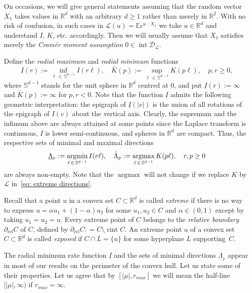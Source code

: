 \documentclass[10pt]{amsart}
\theoremstyle{definition}\newtheorem{defi}[theo]{Definition}\newtheorem{rema}[theo]{Remark}\newtheorem{exam}[theo]{Example}\newtheorem{exem}[theo]{Example}\newtheorem{nota}[theo]{Notation}
\DeclareMathOperator{\rint}{rint}
\DeclareMathOperator{\intr}{int}
\DeclareMathOperator{\rel}{rel}
\newcommand{\ubar}[1]{\underline{#1}}
\newcommand{\Rbb}{\mathbb{R}}
\newcommand{\E}{\mathbb{E}}
\newcommand{\Sbb}{\mathbb{S}}
\newcommand{\Dcl}{\mathcal{D}}
\newcommand{\Lcl}{\mathcal{L}}
\newcommand{\argmax}{\mathop{\mathrm{argmax}}\nolimits}
\newcommand{\argmin}{\mathop{\mathrm{argmin}}\nolimits}
\begin{document}
On occasions, we will give general statements assuming that the random vector $X_1$ takes values in $\Rbb^d$ with an arbitrary $d \ge 1$ rather than merely in $\Rbb^2$. With no risk of confusion, in such cases in $\Lcl(u)= \E e^{u\,\cdot\,X_1}$ we take $u \in \Rbb^d$ and understand $I$, $K$, etc. accordingly. Then we will usually assume that $X_1$ satisfies merely the \emph{Cram\'er moment assumption} $0 \in \intr \Dcl_{\Lcl}$.

Define the \emph{radial maximum} and \emph{radial minimum} functions
\begin{equation}\label{eq: radial functions}
\ubar{I}(r):= \inf_{\ell\,\in\,\Sbb^{d-1}} I(r\ell), \quad \bar K(p):= \sup_{\ell\,\in\,\Sbb^{d-1}} K(p\ell), \quad p, r \ge 0,
\end{equation}
where $\Sbb^{d-1}$ stands for the unit sphere in $\Rbb^d$ centred at $0$, and put $\ubar I(r):= \infty$ and $\bar K(p) := \infty$ for $p, r<0$. Note that the function $\ubar I$ admits the following geometric interpretation: the epigraph of $\ubar I(|v|)$ is the union of all rotations of the epigraph of $I(v)$ about the vertical axis. Clearly, the supremum and the infimum above are always attained at some points since the Laplace transform is continuous, $I$ is lower semi-continuous, and spheres in $\Rbb^d$ are compact. Thus, the respective sets of minimal and maximal directions
\begin{equation}\label{eq: extreme directions}
\ubar{\Lambda}_r:=\argmin \limits_{\ell\,\in\,\Sbb^{d-1}} I(r \ell), \quad \bar{\Lambda}_p:= \argmax \limits_{\ell\,\in\, \Sbb^{d-1}} K(p \ell), \quad r,p \ge 0
\end{equation}
are always non-empty. Note that the $\argmax$ will not change if we replace $K$ by $\Lcl$ in~\eqref{eq: extreme directions}.



Recall that a point $u$ in a convex set $C \subset \Rbb^d$ is called \emph{extreme} if there is no way to express $u = \alpha u_1 + (1- \alpha) u_2$ for some $u_1, u_2 \in C$ and $\alpha \in (0,1)$ except by taking $u_1=u_2=u$. Every extreme point of $C$ belongs to the \emph{relative boundary} $\partial_{\rel} C$ of $C$, defined by $\partial_{\rel} C: =C \setminus \rint C$. An extreme point $u$ of a convex set $C \subset \Rbb^d$ is called \emph{exposed} if $C \cap L = \{ u \}$ for some hyperplane $L$ supporting~$C$.

The radial minimum rate function $\ubar{I}$ and the sets of minimal directions $\ubar{\Lambda}_r$ appear in most of our results on the perimeter of the convex hull. Let us state some of their properties. Let us agree that by $[|\mu|, r_{max}]$ we will mean the half-line $[|\mu|, \infty)$ if $r_{max}=\infty$.
\end{document}
